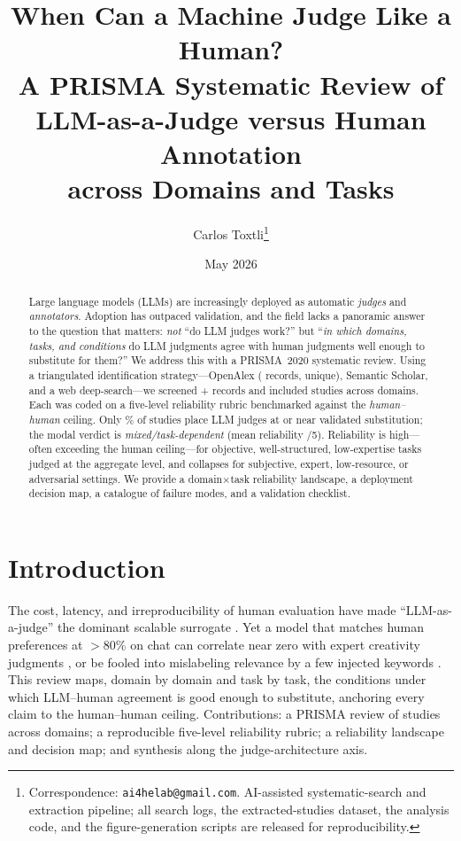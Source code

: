 \documentclass[11pt]{article}
\title{\textbf{When Can a Machine Judge Like a Human?}\\[2pt]
\large A PRISMA Systematic Review of LLM-as-a-Judge versus Human Annotation\\
across \Ndomains{} Domains and Tasks}
\author{Carlos Toxtli\thanks{Correspondence: \texttt{ai4helab@gmail.com}. AI-assisted systematic-search and
extraction pipeline; all search logs, the extracted-studies dataset, the analysis code, and the figure-generation
scripts are released for reproducibility.}}
\date{May 2026}
\begin{document}
\maketitle

\begin{abstract}
\noindent
Large language models (LLMs) are increasingly deployed as automatic \emph{judges} and \emph{annotators}. Adoption
has outpaced validation, and the field lacks a panoramic answer to the question that matters: \emph{not} ``do LLM
judges work?'' but ``\emph{in which domains, tasks, and conditions} do LLM judgments agree with human judgments well
enough to substitute for them?'' We address this with a PRISMA~2020 systematic review. Using a triangulated
identification strategy---OpenAlex (\OAretrieved{} records, \OAunique{} unique), Semantic Scholar, and a web
deep-search---we screened \Nexclscreen{}+ records and included \Nstudies{} studies across \Ndomains{} domains. Each
was coded on a five-level reliability rubric benchmarked against the \emph{human--human} ceiling. Only \Pctreliable\%
of studies place LLM judges at or near validated substitution; the modal verdict is \emph{mixed/task-dependent}
(mean reliability \Meanrel/5). Reliability is high---often exceeding the human ceiling---for objective,
well-structured, low-expertise tasks judged at the aggregate level, and collapses for subjective, expert,
low-resource, or adversarial settings. We provide a domain$\times$task reliability landscape, a deployment decision
map, a catalogue of failure modes, and a validation checklist.
\end{abstract}

\tableofcontents
\bigskip

\section{Introduction}
The cost, latency, and irreproducibility of human evaluation have made ``LLM-as-a-judge'' the dominant scalable
surrogate \citep{zheng2023mtbench,gu2024survey}. Yet a model that matches human preferences at $>$80\% on chat
\citep{zheng2023mtbench} can correlate near zero with expert creativity judgments \citep{chakrabarty2024artartifice},
or be fooled into mislabeling relevance by a few injected keywords \citep{alaofi2024fooledrelevant}. This review maps,
domain by domain and task by task, the conditions under which LLM--human agreement is good enough to substitute,
anchoring every claim to the human--human ceiling. Contributions: a PRISMA review of \Nstudies{} studies across
\Ndomains{} domains; a reproducible five-level reliability rubric; a reliability landscape and decision map; and
synthesis along the judge-architecture axis.
\end{document}
